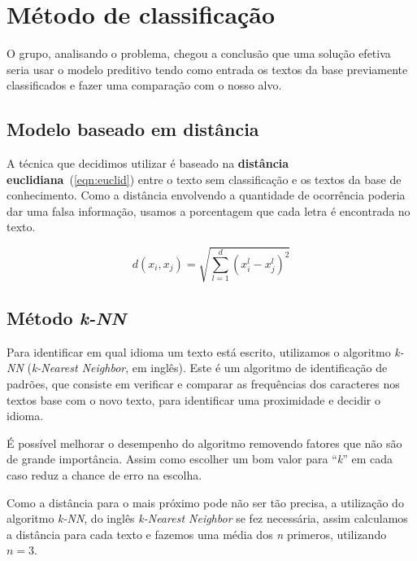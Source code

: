 \section{Método de classificação}
O grupo, analisando o problema, chegou a conclusão que uma solução efetiva seria usar o modelo preditivo tendo como entrada os textos da base previamente classificados e fazer uma comparação com o nosso alvo.

\subsection{Modelo baseado em distância}
A técnica que decidimos utilizar é baseado na \textbf{distância euclidiana}~(\ref{eqn:euclid}) entre o texto sem classificação e os textos da base de conhecimento. Como a distância envolvendo a quantidade de ocorrência poderia dar uma falsa informação, usamos a porcentagem que cada letra é encontrada no texto.

\begin{equation}
d(x_i, x_j) = \sqrt{\sum_{l=1}^{d} (x^l_i - x^l_j)^2}
\label{eqn:euclid}
\end{equation}

\subsection{Método \emph{k-NN}}
Para identificar em qual idioma um texto está escrito, utilizamos o algoritmo \emph{k-NN} (\emph{k-Nearest Neighbor}, em inglês). Este é um algoritmo de identificação de padrões, que consiste em verificar e comparar as frequências dos caracteres nos textos base com o novo texto, para identificar uma proximidade e decidir o idioma.

É possível melhorar o desempenho do algoritmo removendo fatores que não são de grande importância. Assim como escolher um bom valor para “\emph{k}” em cada caso reduz a chance de erro na escolha.

Como a distância para o mais próximo pode não ser tão precisa, a utilização do algoritmo \emph{k-NN}, do inglês \emph{k-Nearest Neighbor} se fez necessária, assim calculamos a distância para cada texto e fazemos uma média dos \emph{n} primeros, utilizando \(n = 3\).

